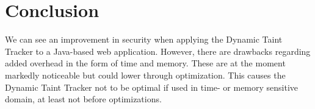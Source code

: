 \chapter{Conclusion}

We can see an improvement in security when applying the Dynamic Taint Tracker to a Java-based web application. However, there are drawbacks regarding added overhead in the form of time and memory. These are at the moment markedly noticeable but could lower through optimization. This causes the Dynamic Taint Tracker not to be optimal if used in time- or memory sensitive domain, at least not before optimizations.